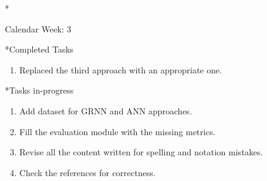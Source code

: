 \documentclass[11pt,a4paper]{article}
\begin{document}
\newpage
\begin{section}*{Calendar Week: 3  \hfill \date{22 January, 2021}}
 \begin{refsection}

       \begin{subsection}*{Completed Tasks}
             \begin{enumerate}
                   \item
                         Replaced the third approach with an appropriate one.
             \end{enumerate}
       \end{subsection}

       \begin{subsection}*{Tasks in-progress}
             \begin{enumerate}
                   \item
                         Add dataset for GRNN and ANN approaches.
                   \item
                         Fill the evaluation module with the missing metrics.
                   \item
                         Revise all the content written for spelling and notation mistakes.
                   \item
                         Check the references for correctness.
             \end{enumerate}
       \end{subsection}

 \end{refsection}
\end{section}
\end{document}
